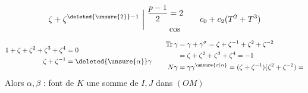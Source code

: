 \[
\zeta+\zeta^{\deleted{\unsure{2}}-1}\ \bigg|\ \begin{aligned}\frac{p-1}{2}&=2\\ &\cos\end{aligned}
\qquad c_0+c_2(T^2+T^3)
\]
\[
\begin{aligned}
1+\zeta+\zeta^2+\zeta^3+\zeta^4&=0\\
\zeta+\zeta^{-1}&=\deleted{\unsure{\alpha}}\gamma
\end{aligned}
\qquad
\begin{aligned}
\operatorname{Tr}\gamma&=\gamma+\gamma^\sigma=\zeta+\zeta^{-1}+\zeta^2+\zeta^{-2}\\
&=\zeta+\zeta^2+\zeta^3+\zeta^4=-1\\
N\gamma&=\gamma\gamma^{\unsure{\sigma|\alpha}}=(\zeta+\zeta^{-1})(\zeta^2+\zeta^{-2})=
\end{aligned}
\]
Alors $\alpha,\beta$ :
 font de $K$ une somme de $I,J$ dans $(OM)$


